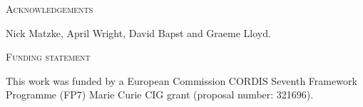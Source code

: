 \documentclass[12pt,letterpaper]{article}
\renewcommand{\section}[1]{%
\bigskip
\begin{center}
\begin{Large}
\normalfont\scshape #1
\medskip
\end{Large}
\end{center}}
\begin{document}
\section{Acknowledgements}
Nick Matzke, April Wright, David Bapst and Graeme Lloyd.
\section{Funding statement}
This work was funded by a European Commission CORDIS Seventh Framework Programme (FP7) Marie Curie CIG grant (proposal number: 321696).





\newcommand{\beginsupplement}{%
    \setcounter{table}{0}
    \renewcommand{\thetable}{S\arabic{table}}%
    \setcounter{figure}{0}
    \renewcommand{\thefigure}{S\arabic{figure}}%
}
\beginsupplement



\end{document}
